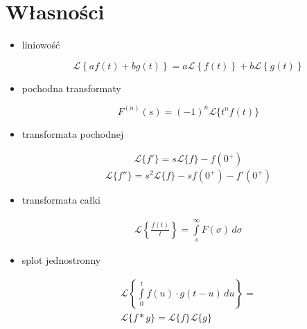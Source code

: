 \documentclass{article}
\begin{document}
\section*{Własności}
\begin{itemize}
    \item liniowość
    
    \begin{displaymath}
    \mathcal{L}\left\{a f(t) + b g(t) \right\}= a \mathcal{L}\left\{ f(t) \right\} + b \mathcal{L}\left\{ g(t) \right\}
    \end{displaymath}

    
    \item pochodna transformaty
    
    \begin{equation*}
         F^{(n)}(s)=(-1)^{n}{\mathcal {L}}\{t^{n}f(t)\}
    \end{equation*}
    
    \item transformata pochodnej
    
    \begin{gather*}
    {\mathcal {L}}\{f'\}=s{\mathcal {L}}\{f\}-f(0^{+})
    \end{gather*}
    $$ \mathcal{L}\{f''\} = s^2 \mathcal{L}\{f\} - s f(0^+) - f'(0^+) $$
    
    \item transformata całki
    
    \begin{eqnarray*}
    \mathcal{L}\left\{ \frac{f(t)}{t} \right\} = \int\limits_s^\infty F(\sigma)\, d\sigma
    \end{eqnarray*}
    
    \item splot jednostronny
    
    \begin{multline*}
        {\mathcal {L}}\left\{\int \limits _{0}^{t}f(u)\cdot g(t-u)\,du\right\}=\\{\mathcal {L}}\{f*g\}={\mathcal {L}}\{f\}{\mathcal {L}}\{g\}
    \end{multline*}
\end{itemize}
\end{document}
